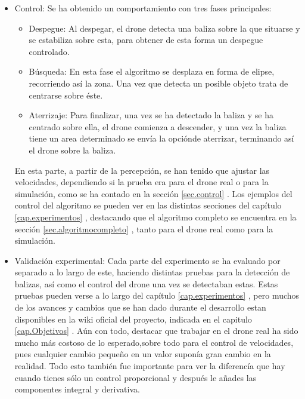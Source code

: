 \begin{itemize}
\item{Control:} Se ha obtenido un comportamiento con tres fases principales:
	\begin{itemize}
		\item{Despegue: } Al despegar, el drone detecta una baliza sobre la que situarse y se estabiliza sobre esta, para obtener de esta forma un despegue controlado.
		\item{B\'usqueda: } En esta fase el algoritmo se desplaza en forma de elipse, recorriendo as\'i la zona. Una vez que detecta un posible objeto trata de centrarse sobre \'este.
		\item{Aterrizaje: } Para finalizar, una vez se ha detectado la baliza y se ha centrado sobre ella, el drone comienza a descender, y una vez la baliza tiene un area determinado se env\'ia la opci\'onde aterrizar, terminando as\'i el drone sobre la baliza.
	\end{itemize}
	

\hspace{1cm} En esta parte, a partir de la percepci\'on, se han tenido que ajustar las velocidades, dependiendo si la prueba era para el drone real o para la simulaci\'on, como se ha contado en la secci\'on \ref{sec.control} . Los ejemplos del control del algoritmo se pueden ver en las distintas secciones del cap\'itulo \ref{cap.experimentos} , destacando que el algoritmo completo se encuentra en la secci\'on \ref{sec.algoritmocompleto} , tanto para el drone real como para la simulaci\'on. 

\item{Validaci\'on experimental:} Cada parte del experimento se ha evaluado por separado a lo largo de este, haciendo distintas pruebas para la detecci\'on de balizas, as\'i como el control del drone una vez se detectaban estas. Estas pruebas pueden verse a lo largo del cap\'itulo \ref{cap.experimentos} , pero muchos de los avances y cambios que se han dado durante el desarrollo estan disponibles en la wiki oficial del proyecto, indicada en el capitulo \ref{cap.Objetivos} . A\'un con todo, destacar que trabajar en el drone real ha sido mucho m\'as costoso de lo esperado,sobre todo para el control de velocidades, pues cualquier cambio pequeño en un valor supon\'ia gran cambio en la realidad. Todo esto tambi\'en fue importante para ver la diferenc\'ia que hay cuando tienes s\'olo un control proporcional y despu\'es le añades las componentes integral y derivativa. 
		
\end{itemize}

